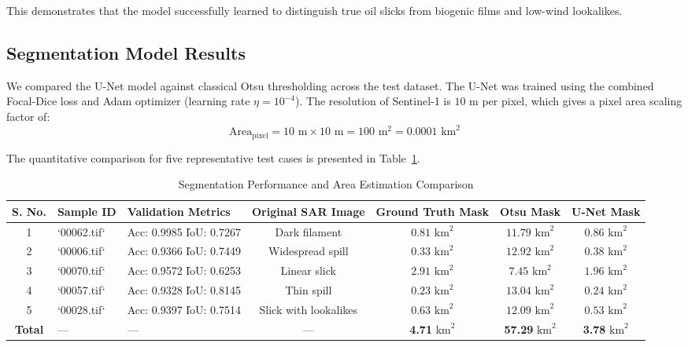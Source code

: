 \documentclass[conference]{IEEEtran}
\begin{document}
This demonstrates that the model successfully learned to distinguish true oil slicks from biogenic films and low-wind lookalikes.

\subsection{Segmentation Model Results}
We compared the U-Net model against classical Otsu thresholding across the test dataset. The U-Net was trained using the combined Focal-Dice loss and Adam optimizer (learning rate $\eta = 10^{-4}$). The resolution of Sentinel-1 is $10\text{ m}$ per pixel, which gives a pixel area scaling factor of:
\begin{equation}
\text{Area}_{\text{pixel}} = 10\text{ m} \times 10\text{ m} = 100\text{ m}^2 = 0.0001\text{ km}^2
\end{equation}

The quantitative comparison for five representative test cases is presented in Table~\ref{tab:segmentation}.

\begin{table}[t]
\caption{Segmentation Performance and Area Estimation Comparison}
\label{tab:segmentation}
\centering
\begin{tabular}{cllcccc}
\toprule
S. No. & Sample ID & Validation Metrics & Original SAR Image & Ground Truth Mask & Otsu Mask & U-Net Mask \\
\midrule
1 & `00062.tif` & Acc: 0.9985 \| IoU: 0.7267 & Dark filament & $0.81\text{ km}^2$ & $11.79\text{ km}^2$ & $0.86\text{ km}^2$ \\
2 & `00006.tif` & Acc: 0.9366 \| IoU: 0.7449 & Widespread spill & $0.33\text{ km}^2$ & $12.92\text{ km}^2$ & $0.38\text{ km}^2$ \\
3 & `00070.tif` & Acc: 0.9572 \| IoU: 0.6253 & Linear slick & $2.91\text{ km}^2$ & $7.45\text{ km}^2$ & $1.96\text{ km}^2$ \\
4 & `00057.tif` & Acc: 0.9328 \| IoU: 0.8145 & Thin spill & $0.23\text{ km}^2$ & $13.04\text{ km}^2$ & $0.24\text{ km}^2$ \\
5 & `00028.tif` & Acc: 0.9397 \| IoU: 0.7514 & Slick with lookalikes & $0.63\text{ km}^2$ & $12.09\text{ km}^2$ & $0.53\text{ km}^2$ \\
\midrule
\textbf{Total} & — & — & — & \textbf{4.71} $\text{km}^2$ & \textbf{57.29} $\text{km}^2$ & \textbf{3.78} $\text{km}^2$ \\
\bottomrule
\end{tabular}
\end{table}
\end{document}
